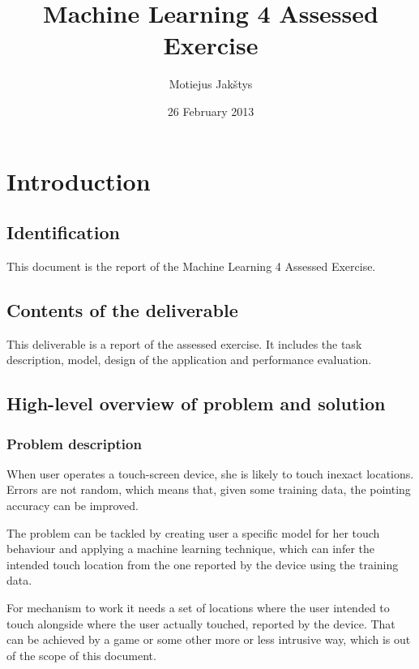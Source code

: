 \documentclass[english,11pt]{article}
\numberwithin{equation}{section}
\begin{document}
\title{Machine Learning 4 Assessed Exercise}
\author{Motiejus Jakštys}
\date{26 February 2013}

\maketitle
\pagebreak
\tableofcontents
\pagebreak

\section{Introduction}
\subsection{Identification}
This document is the report of the Machine Learning 4 Assessed Exercise.

\subsection{Contents of the deliverable}

This deliverable is a report of the assessed exercise. It includes the task
description, model, design of the application and performance evaluation.

\subsection{High-level overview of problem and solution}

\subsubsection{Problem description}

When user operates a touch-screen device, she is likely to touch inexact
locations\cite{WeiRogMur}. Errors are not random, which means that, given some
training data, the pointing accuracy can be improved.

The problem can be tackled by creating user a specific model for her touch
behaviour and applying a machine learning technique, which can infer the
intended touch location from the one reported by the device using the training
data.

For mechanism to work it needs a set of locations where the user intended to
touch alongside where the user actually touched, reported by the device. That
can be achieved by a game or some other more or less intrusive way, which is out
of the scope of this document.
\end{document}
